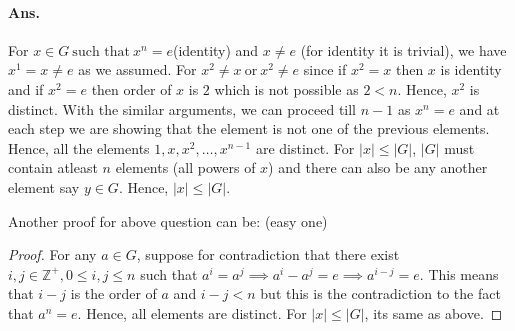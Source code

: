 \documentclass[12pt]{report}
\begin{document}
\paragraph*{Ans. }For $x \in G~\text{such that}~x^n = e$(identity) and $x \neq e$ (for identity it is trivial), we have $x^1 = x \neq e$ as we assumed. For $ x^2 \neq x~\text{or}~x^2 \neq e$ since if $x^2 = x$ then $x$ is identity and if $x^2 = e$ then order of $x$ is $2$ which is not possible as $2 < n$. Hence, $x^2$ is distinct. With the similar arguments, we can proceed till $n-1$ as $x^n = e$ and at each step we are showing that the element is not one of the previous elements. Hence, all the elements $1, x, x^2, \dots, x^{n-1}$ are distinct.
For $|x| \leq |G|$, $|G|$ must contain atleast $n$ elements (all powers of $x$) and there can also be any another element say $y \in G$. Hence, $|x| \leq |G|$.

Another proof for above question can be: (easy one)
\begin{proof}
    For any $a \in G$, suppose for contradiction that there exist $i,j\in \mathbb{Z^+}, 0 \leq i,j \leq n$ such that $a^i = a^j \implies a^i-a^j = e \implies a^{i-j} = e$. This means that $i-j$ is the order of $a$ and $i-j < n$ but this is the contradiction to the fact that $a^n = e$. Hence, all elements are distinct. For $|x| \leq |G|$, its same as above. 
\end{proof}
\end{document}
